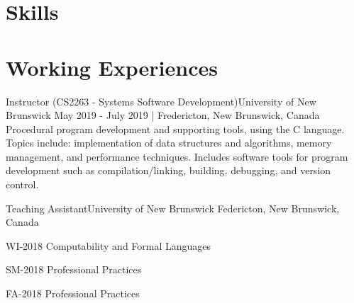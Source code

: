 \documentclass[english,letterpaper]{deedy-resume-openfont}
\begin{document}
\begin{flushleft}
\begin{samepage}
\end{samepage}
\section{Skills}





\section{Working Experiences}

    \employement%
        {Instructor (CS2263 - Systems Software Development)}{University of New Brunswick}
        {May 2019 - July 2019 | Fredericton, New Brunswick, Canada}{%
        Procedural program development and supporting tools, using the C language. 
        Topics include: implementation of data structures and algorithms, memory management, and performance techniques. 
        Includes software tools for program development such as compilation/linking, building, debugging, and version control.
        }

    \employement%
        {Teaching Assistant}{University of New Brunswick}
        {Federicton, New Brunswick, Canada}{%
        \begin{tightemize}
        \item WI-2018 Computability and Formal Languages
        \item SM-2018 Professional Practices
        \item FA-2018 Professional Practices
        \end{tightemize}
        }


\end{flushleft}
\end{document}

